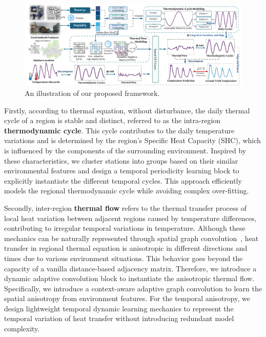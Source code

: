 \begin{figure}
    \centering
    \includegraphics[width=0.95\linewidth]{resources/framework.pdf}
    \vspace{-0.5em}
    \caption{An illustration of our proposed \model framework.}
    \vspace{-1em}
    \label{fig:frame}
\end{figure}
Firstly, according to thermal equation, without disturbance, the daily thermal cycle of a region is stable and distinct, referred to as the intra-region \textbf{thermodynamic cycle}. This cycle contributes to the daily temperature variations and is determined by the region's Specific Heat Capacity (SHC), which is influenced by the components of the surrounding environment. Inspired by these characteristics, we cluster stations into groups based on their similar environmental features and design a temporal periodicity learning block to explicitly instantiate the different temporal cycles. This approach efficiently models the regional thermodynamic cycle while avoiding complex over-fitting.

Secondly, inter-region \textbf{thermal flow} refers to the thermal transfer process of local heat variation between adjacent regions caused by temperature differences, contributing to irregular temporal variations in temperature. Although these mechanics can be naturally represented through spatial graph convolution~\cite{zou2024learning,song2020spatial,lu2020spatiotemporal,alet2019graph,sanchez2020learning}, heat transfer in regional thermal equation is anisotropic in different directions and times due to various environment situations. This behavior goes beyond the capacity of a vanilla distance-based adjacency matrix. Therefore, we introduce a dynamic adaptive convolution block to instantiate the anisotropic thermal flow. Specifically, we introduce a context-aware adaptive graph convolution to learn the spatial anisotropy from environment features. For the temporal anisotropy, we design lightweight temporal dynamic learning mechanics to represent the temporal variation of heat transfer without introducing redundant model complexity.


